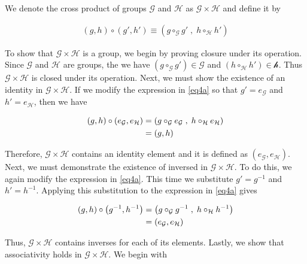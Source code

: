 \documentclass[../CryptoFinal.tex]{subfiles}
\begin{document}
\begin{flushleft}



 We denote the cross product of groups $\mathcal{G}$ and $\mathcal{H}$ as $\mathcal{G} \times \mathcal{H}$ and define it by 

\begin{align}
  \left( g, h \right) \circ \left( g', h' \right) \equiv \left( g \circ_\mathcal{G} g' \; , \; h \circ_\mathcal{H} h' \right) \label{eq4a}
\end{align}

To show that $\mathcal{G} \times \mathcal{H}$ is a group, we begin by proving closure under its operation.  Since $\mathcal{G}$ and $\mathcal{H}$ are groups, the we have $\left( g \circ_\mathcal{G} g' \right) \in \mathcal{G}$ and $\left( h \circ_\mathcal{H} h' \right) \in \mathcal{h}$.  Thus $\mathcal{G} \times \mathcal{H}$ is closed under its operation.  Next, we must show the existence of an identity in $\mathcal{G} \times \mathcal{H}$.  If we modify the expression in \ref{eq4a} so that $g' = e_\mathcal{G}$ and $h' = e_\mathcal{H}$, then we have 

\begin{align}
  \left( g, h \right) \circ \left( e_\mathcal{G}, e_\mathcal{H} \right) &= \left( g \circ_\mathcal{G} e_\mathcal{G} \; , \; h \circ_\mathcal{H} e_\mathcal{H} \right) \notag \\
  &= \left( g, h \right) \notag
\end{align}

Therefore, $\mathcal{G} \times \mathcal{H}$ contains an identity element and it is defined as $\left( e_\mathcal{G}, e_\mathcal{H} \right)$.  Next, we must demonstrate the existence of inversed in $\mathcal{G} \times \mathcal{H}$.  To do this, we again modify the expression in \ref{eq4a}.  This time we substitute $g' = g^{-1}$ and $h' = h^{-1}$.  Applying this substitution to the expression in \ref{eq4a} gives

\begin{align}
  \left( g, h \right) \circ \left( g^{-1}, h^{-1} \right) &= \left( g \circ_\mathcal{G} g^{-1} \; , \; h \circ_\mathcal{H} h^{-1} \right) \notag \\
  &= \left( e_\mathcal{G}, e_\mathcal{H} \right) \notag
\end{align}

Thus, $\mathcal{G} \times \mathcal{H}$ contains inverses for each of its elements.  Lastly, we show that associativity holds in $\mathcal{G} \times \mathcal{H}$.  We begin with


\end{flushleft}
\end{document}
